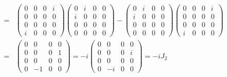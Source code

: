 \documentclass[11pt]{article}
\begin{document}
\begin{eqnarray}
    [k_3,k_1]&=&
    \begin{pmatrix}
        0 & 0 & 0 & i \\
        0 & 0 & 0 & 0 \\
        0 & 0 & 0 & 0 \\
        i & 0 & 0 & 0 
    \end{pmatrix}
    \begin{pmatrix}
        0 & i & 0 & 0\\ 
        i & 0 & 0 & 0 \\
        0 & 0 & 0 & 0 \\
        0 & 0 & 0 & 0 
    \end{pmatrix}
    -
    \begin{pmatrix}
        0 & i & 0 & 0\\ 
        i & 0 & 0 & 0 \\
        0 & 0 & 0 & 0 \\
        0 & 0 & 0 & 0 
    \end{pmatrix}
    \begin{pmatrix}
        0 & 0 & 0 & i \\
        0 & 0 & 0 & 0 \\
        0 & 0 & 0 & 0 \\
        i & 0 & 0 & 0 
    \end{pmatrix} \\
    &=&
    \begin{pmatrix}
        0 & 0 & 0 & 0 \\
        0 & 0 & 0 & 1 \\
        0 & 0 & 0 & 0 \\
        0 & -1 & 0 & 0 
    \end{pmatrix}
    =-i
    \begin{pmatrix}
        0 & 0 & 0 & 0 \\
        0 & 0 & 0 & i \\
        0 & 0 & 0 & 0 \\
        0 & -i & 0 & 0 
    \end{pmatrix}
    =-iJ_2
\end{eqnarray}
\end{document}
